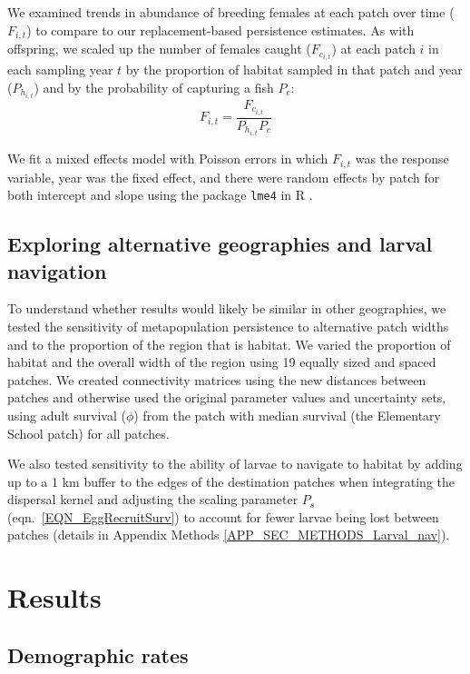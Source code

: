 \documentclass[12pt, oneside]{article}   	%
\begin{document}
We examined trends in abundance of breeding females at each patch over time ($F_{i,t}$) to compare to our replacement-based persistence estimates. As with offspring, we scaled up the number of females caught ($F_{c_{i,t}}$) at each patch $i$ in each sampling year $t$ by the proportion of habitat sampled in that patch and year ($P_{h_{i,t}}$) and by the probability of capturing a fish $P_c$:
\begin{equation}
F_{i,t} = \frac{F_{c_{i,t}}}{P_{h_{i,t}}P_c}
\end{equation}

We fit a mixed effects model with Poisson errors in which $F_{i,t}$ was the response variable, year was the fixed effect, and there were random effects by patch for both intercept and slope using the package \texttt{lme4} in R \citep{lme42015package}.

\subsection*{Exploring alternative geographies and larval navigation}

To understand whether results would likely be similar in other geographies, we tested the sensitivity of metapopulation persistence to alternative patch widths and to the proportion of the region that is habitat. We varied the proportion of habitat and the overall width of the region using 19 equally sized and spaced patches. We created connectivity matrices using the new distances between patches and otherwise used the original parameter values and uncertainty sets, using adult survival ($\phi$) from the patch with median survival (the Elementary School patch) for all patches.

We also tested sensitivity to the ability of larvae to navigate to habitat by adding up to a 1 km buffer to the edges of the destination patches when integrating the dispersal kernel and adjusting the scaling parameter $P_s$ (eqn.\ \ref{EQN_EggRecruitSurv}) to account for fewer larvae being lost between patches (details in Appendix Methods \ref{APP_SEC_METHODS_Larval_nav}).

\section*{Results} 

\subsection*{Demographic rates}
\end{document}
